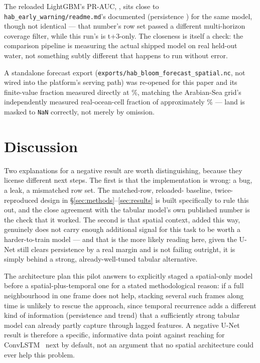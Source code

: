  The reloaded LightGBM's PR-AUC,
\LgbmPRAUC{}, sits close to \texttt{hab\_early\_warning/readme.md}'s
documented \ReadmeLGBMPRAUC{} (persistence \ReadmePersistPRAUC{}) for the
same model, though not identical --- that number's row set passed a
different multi-horizon coverage filter, while this run's is t+3-only. The
closeness is itself a check: the comparison pipeline is measuring the
actual shipped model on real held-out water, not something subtly
different that happens to run without error.

 A standalone forecast export
(\texttt{exports/hab\_bloom\_forecast\_spatial.nc}, not wired into the
platform's serving path) was re-opened for this paper and its finite-value
fraction measured directly at \ExportFiniteFrac{}\%, matching the
Arabian-Sea grid's independently measured real-ocean-cell fraction of
approximately \ExportOceanFrac{}\% --- land is masked to \texttt{NaN}
correctly, not merely by omission.

\section{Discussion}

Two explanations for a negative result are worth distinguishing, because
they license different next steps. The first is that the implementation is
wrong: a bug, a leak, a mismatched row set. The matched-row, reloaded-
baseline, twice-reproduced design in \S\ref{sec:methods}--\ref{sec:results}
is built specifically to rule this out, and the close agreement with the
tabular model's own published number is the check that it worked. The
second is that spatial context, added this way, genuinely does not carry
enough additional signal for this task to be worth a harder-to-train model
--- and that is the more likely reading here, given the U-Net still clears
persistence by a real margin and is not failing outright, it is simply
behind a strong, already-well-tuned tabular alternative.

 The architecture plan
this pilot answers to explicitly staged a spatial-only model before a
spatial-plus-temporal one for a stated methodological reason: if a full
neighbourhood in one frame does not help, stacking several such frames
along time is unlikely to rescue the approach, since temporal recurrence
adds a different kind of information (persistence and trend) that a
sufficiently strong tabular model can already partly capture through
lagged features. A negative U-Net result is therefore a specific, informative
data point against reaching for ConvLSTM~\citep{shi2015} next by default,
not an argument that no spatial architecture could ever help this problem.

